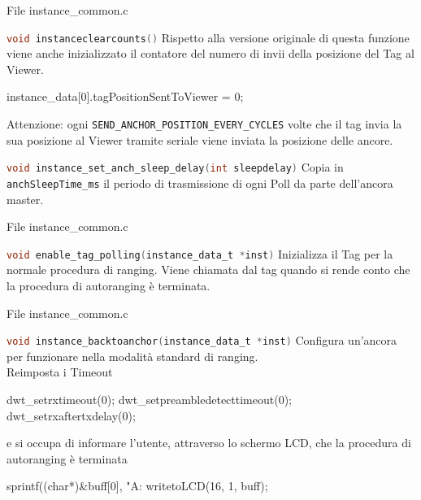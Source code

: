 \begin{frame}[fragile]{File instance\_common.c}
  \begin{block}{\lstinline[language=C]!void instanceclearcounts()!}
    Rispetto alla versione originale di questa funzione viene anche inizializzato il contatore
    del numero di invii della posizione del Tag al Viewer.
    \begin{C}
      instance_data[0].tagPositionSentToViewer = 0;
    \end{C}
    \textcolor{dgreen}{Attenzione:} ogni \lstinline[language=C]!SEND_ANCHOR_POSITION_EVERY_CYCLES! volte che il tag invia la sua posizione al Viewer tramite seriale viene inviata la posizione delle ancore.
  \end{block}
  \begin{block}{\lstinline[language=C]!void instance_set_anch_sleep_delay(int sleepdelay)!}
    Copia in \lstinline[language=C]!anchSleepTime_ms! il periodo di trasmissione di ogni Poll da parte dell'ancora master.
  \end{block}
\end{frame}

\begin{frame}{File instance\_common.c}
  \begin{block}{\lstinline[language=C]!void enable_tag_polling(instance_data_t *inst)!}
    Inizializza il Tag per la normale procedura di ranging. Viene chiamata
    dal tag quando si rende conto che la procedura di autoranging è terminata.
  \end{block}
\end{frame}

\begin{frame}[fragile]{File instance\_common.c}
  \begin{block}{\lstinline[language=C]!void instance_backtoanchor(instance_data_t *inst)!}
    Configura un'ancora per funzionare nella modalità standard di ranging.\\
    Reimposta i Timeout
    \begin{C}
      dwt_setrxtimeout(0);
      dwt_setpreambledetecttimeout(0);
      dwt_setrxaftertxdelay(0);
    \end{C}
    e si occupa di informare l'utente, attraverso lo schermo LCD, che la procedura di autoranging è terminata
    \begin{C}
      sprintf((char*)&buff[0], "A:%
      writetoLCD(16, 1, buff);
    \end{C}
  \end{block}
\end{frame}

